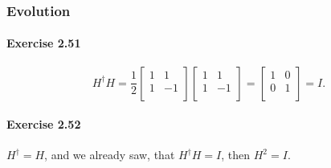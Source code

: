 \documentclass[a4paper,12pt]{article}
\newcommand{\exercise}[1]{\paragraph{Exercise #1}}
\begin{document}
    \setcounter{subsubsection}{1}
    \subsubsection{Evolution}

    \exercise{2.51}
    \begin{equation}
        H^\dagger H = \frac{1}{2}
        \begin{bmatrix}
            1 & 1\\
            1 & -1\\
        \end{bmatrix}
        \begin{bmatrix}
            1 & 1\\
            1 & -1\\
        \end{bmatrix}
        =
        \begin{bmatrix}
            1 & 0\\
            0 & 1\\
        \end{bmatrix}
        = I \textrm{.}
    \end{equation}

    \exercise{2.52} $H^\dagger = H$, and we already saw, that $H^\dagger H = I$, then $H^2 = I$.
\end{document}
